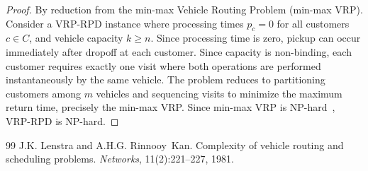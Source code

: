 \documentclass[10pt,a4paper]{amsart}
\begin{document}
\begin{proof}
By reduction from the min-max Vehicle Routing Problem (min-max VRP). 
Consider a VRP-RPD instance where processing times $p_c = 0$ for all 
customers $c \in C$, and vehicle capacity $k \geq n$. Since processing 
time is zero, pickup can occur immediately after dropoff at each customer. 
Since capacity is non-binding, each customer requires exactly one visit 
where both operations are performed instantaneously by the same vehicle. 
The problem reduces to partitioning customers among $m$ vehicles and 
sequencing visits to minimize the maximum return time, precisely the 
min-max VRP. Since min-max VRP is NP-hard~\cite{lenstra1981complexity}, 
VRP-RPD is NP-hard.
\end{proof}

\begin{thebibliography}{99}
 J.K. Lenstra and A.H.G. Rinnooy~Kan. Complexity of vehicle routing and scheduling problems. {\em Networks}, 11(2):221--227, 1981.
\end{thebibliography}
\end{document}
